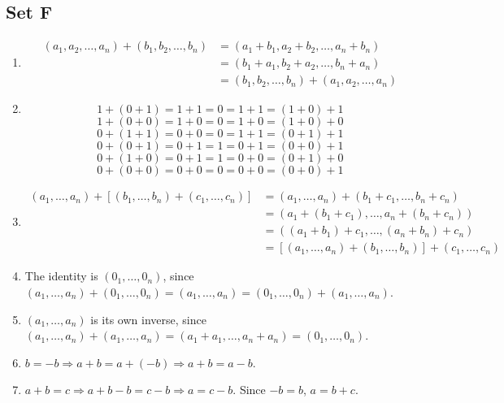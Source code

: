 \documentclass{article}
\begin{document}
\subsection*{Set F}
\begin{enumerate}
    \item \begin{equation*}
            \begin{split}
                (a_1, a_2, \ldots, a_n) + (b_1, b_2, \ldots, b_n) & = (a_1 + b_1, a_2 + b_2, \ldots, a_n + b_n) \\
                                                                   & = (b_1 + a_1, b_2 + a_2, \ldots, b_n + a_n) \\
                                                                  & = (b_1, b_2, \ldots, b_n) + (a_1, a_2, \ldots, a_n)
            \end{split}
        \end{equation*}
    \item 
        $$1 + (0 + 1) = 1 + 1 = 0 = 1 + 1 = (1 + 0) + 1$$
        $$1 + (0 + 0) = 1 + 0 = 0 = 1 + 0 = (1 + 0) + 0$$
        $$0 + (1 + 1) = 0 + 0 = 0 = 1 + 1 = (0 + 1) + 1$$
        $$0 + (0 + 1) = 0 + 1 = 1 = 0 + 1 = (0 + 0) + 1$$
        $$0 + (1 + 0) = 0 + 1 = 1 = 0 + 0 = (0 + 1) + 0$$
        $$0 + (0 + 0) = 0 + 0 = 0 = 0 + 0 = (0 + 0) + 1$$
    \item
        \begin{equation*}
            \begin{split}
                (a_1, \ldots, a_n) + [(b_1, \ldots, b_n) + (c_1, \ldots, c_n)] & = (a_1, \ldots, a_n) + (b_1 + c_1, \ldots, b_n + c_n) \\
                                                                               & = (a_1 + (b_1 + c_1), \ldots, a_n + (b_n + c_n)) \\
                                                                               & = ((a_1 + b_1) + c_1, \ldots, (a_n + b_n) + c_n) \\
                                                                               & = [(a_1, \ldots, a_n) + (b_1, \ldots, b_n)] + (c_1, \ldots, c_n)
            \end{split}
        \end{equation*}
    \item The identity is $(0_1, \ldots, 0_n)$, since $(a_1, \ldots, a_n) + (0_1, \ldots, 0_n) = (a_1, \ldots, a_n) = (0_1, \ldots, 0_n) + (a_1, \ldots, a_n)$.
    \item $(a_1, \ldots, a_n)$ is its own inverse, since $(a_1, \ldots, a_n) + (a_1, \ldots, a_n) = (a_1 + a_1, \ldots, a_n + a_n) = (0_1, \ldots, 0_n)$.
    \item $b = -b \Rightarrow a + b = a + (-b) \Rightarrow a + b = a - b$.
    \item $a + b = c \Rightarrow a + b - b = c - b \Rightarrow a = c - b$. Since $-b = b$, $a = b + c$.
\end{enumerate}
\end{document}
